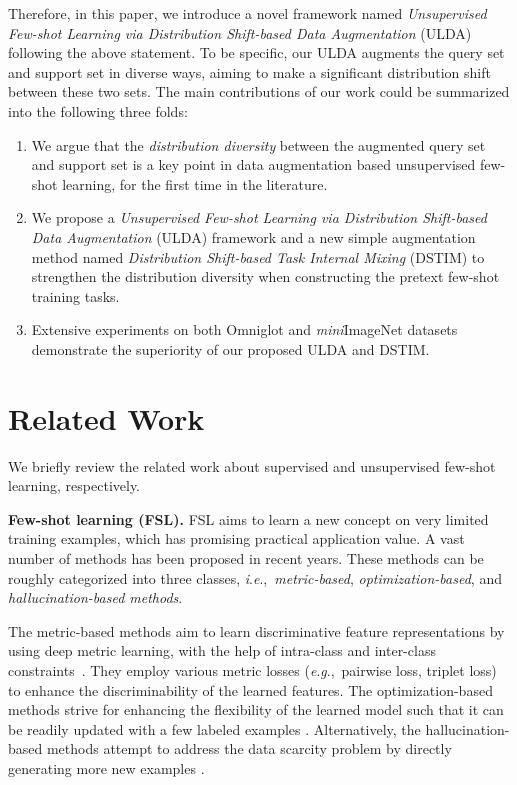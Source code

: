 \documentclass[letterpaper]{article} \usepackage{aaai21}  \usepackage{times}  \usepackage{helvet} \usepackage{courier}  \usepackage[hyphens]{url}  \usepackage{graphicx} \urlstyle{rm} \def\UrlFont{\rm}  \usepackage{natbib}  \usepackage{caption} \usepackage{url}
\newcommand{\ie}{\textit{i}.\textit{e}.,}
\newcommand{\eg}{\textit{e}.\textit{g}.,}
\begin{document}
Therefore, in this paper, we introduce a novel framework named \textit{Unsupervised Few-shot Learning via Distribution Shift-based Data Augmentation} (ULDA) following the above statement. To be specific, our ULDA augments the query set and support set in diverse ways, aiming to make a significant distribution shift between these two sets. The main contributions of our work could be summarized into the following three folds: 
\begin{enumerate}
    \item We argue that the \textit{distribution diversity} between the augmented query set and support set is a key point in data augmentation based unsupervised few-shot learning, for the first time in the literature.
    \item  We propose a \textit{Unsupervised Few-shot Learning via Distribution Shift-based Data Augmentation} (ULDA) framework and a new simple augmentation method named \emph{Distribution Shift-based Task Internal Mixing} (DSTIM) to strengthen the distribution diversity when constructing the pretext few-shot training tasks.
    \item Extensive experiments on both Omniglot and \emph{mini}ImageNet datasets demonstrate the superiority of our proposed ULDA and DSTIM.
\end{enumerate}









\section{Related Work}

\label{sec:related_work}
We briefly review the related work about supervised and unsupervised few-shot learning, respectively. 


\textbf{Few-shot learning (FSL).} FSL aims to learn a new concept on very limited training examples, which has promising practical application value. A vast number of methods has been proposed in recent years. These methods can be roughly categorized into three classes, \ie~\emph{metric-based}, \emph{optimization-based}, and \emph{hallucination-based methods}.


The metric-based methods aim to learn discriminative feature representations by using deep metric learning, with the help of intra-class and inter-class constraints~\cite{Vinyals2016NIPS,Snell2016NIPS,Sung2018CVPR,Li2019DN4}. They employ various metric losses (\eg~pairwise loss, triplet loss) to enhance the discriminability of the learned features. The optimization-based methods strive for enhancing the flexibility of the learned model such that it can be readily updated with a few labeled examples \cite{RaviICLR2017,FinnICML2017,LeeCVPR2019meta,ChenICLR2019close}. Alternatively, the hallucination-based methods attempt to address the data scarcity problem by directly generating more new examples \cite{ZhangCVPR2019,AlfassyCVPR2019,ChenCVPR2019,Chen2019AAAI,ChenTIP2019}.
\end{document}
